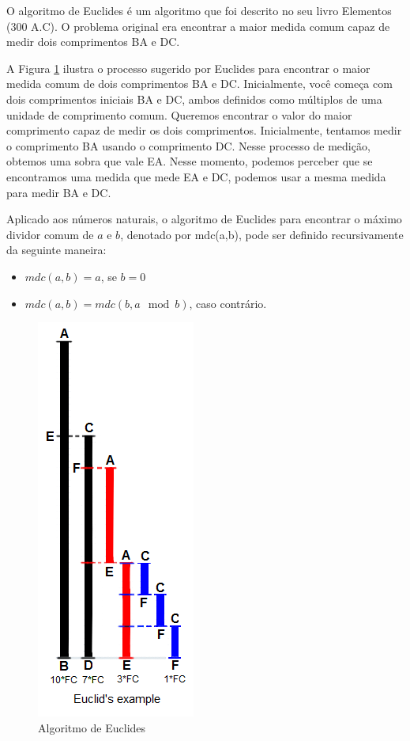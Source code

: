 \begin{exemplo}
O algoritmo de Euclides é um algoritmo que foi descrito no seu livro Elementos (300 A.C). O problema original era encontrar a maior medida comum capaz de medir dois comprimentos BA e DC. 

A Figura \ref{fig::euclides} ilustra o processo sugerido por Euclides para encontrar o maior medida comum de dois comprimentos BA e DC. Inicialmente, você começa com dois comprimentos iniciais BA e DC, ambos definidos como múltiplos de uma unidade de comprimento comum. Queremos encontrar o valor do maior comprimento capaz de medir os dois comprimentos. Inicialmente, tentamos medir o comprimento BA usando o comprimento DC. Nesse processo de medição, obtemos uma sobra que vale EA. Nesse momento, podemos perceber que se encontramos uma medida que mede EA e DC, podemos usar a mesma medida para medir BA e DC.

Aplicado aos números naturais, o algoritmo de Euclides para encontrar o máximo dividor comum de $a$ e $b$, denotado por mdc(a,b), pode ser definido  recursivamente  da seguinte maneira:

\begin{itemize}
    \item $mdc(a, b) = a$, se $b=0$
    \item $mdc(a, b) = mdc(b, a \mod b)$, caso contrário. 
\end{itemize}

\end{exemplo}


\begin{figure}[!h]
\label{fig::euclides}
\centering
\includegraphics[scale=0.5]{images/Euclid Example.png}
\caption{Algoritmo de Euclides}
\end{figure}


